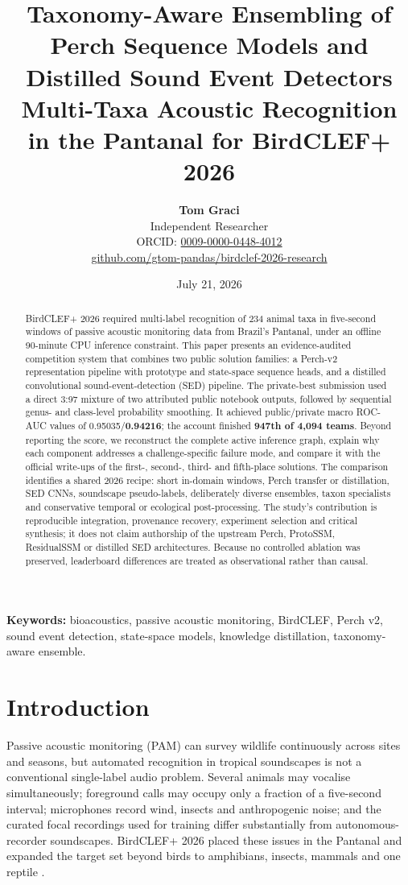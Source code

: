 \documentclass[10pt,a4paper]{article}
\title{\vspace{-1.2cm}\textcolor{deepblue}{\textbf{Taxonomy-Aware Ensembling of Perch Sequence Models and Distilled Sound Event Detectors}}\\[3pt]
\Large Multi-Taxa Acoustic Recognition in the Pantanal for BirdCLEF+ 2026}
\author{\textbf{Tom Graci}\\Independent Researcher\\
ORCID: \href{https://orcid.org/0009-0000-0448-4012}{0009-0000-0448-4012}\\
\href{https://github.com/gtom-pandas/birdclef-2026-research}{github.com/gtom-pandas/birdclef-2026-research}}
\date{July 21, 2026}
\begin{document}
\maketitle

\begin{abstract}
BirdCLEF+ 2026 required multi-label recognition of 234 animal taxa in five-second windows of passive acoustic monitoring data from Brazil's Pantanal, under an offline 90-minute CPU inference constraint. This paper presents an evidence-audited competition system that combines two public solution families: a Perch-v2 representation pipeline with prototype and state-space sequence heads, and a distilled convolutional sound-event-detection (SED) pipeline. The private-best submission used a direct 3:97 mixture of two attributed public notebook outputs, followed by sequential genus- and class-level probability smoothing. It achieved public/private macro ROC-AUC values of 0.95035/\textbf{0.94216}; the account finished \textbf{947th of 4,094 teams}. Beyond reporting the score, we reconstruct the complete active inference graph, explain why each component addresses a challenge-specific failure mode, and compare it with the official write-ups of the first-, second-, third- and fifth-place solutions. The comparison identifies a shared 2026 recipe: short in-domain windows, Perch transfer or distillation, SED CNNs, soundscape pseudo-labels, deliberately diverse ensembles, taxon specialists and conservative temporal or ecological post-processing. The study's contribution is reproducible integration, provenance recovery, experiment selection and critical synthesis; it does not claim authorship of the upstream Perch, ProtoSSM, ResidualSSM or distilled SED architectures. Because no controlled ablation was preserved, leaderboard differences are treated as observational rather than causal.
\end{abstract}

\noindent\textbf{Keywords:} bioacoustics, passive acoustic monitoring, BirdCLEF, Perch v2, sound event detection, state-space models, knowledge distillation, taxonomy-aware ensemble.

\section{Introduction}
Passive acoustic monitoring (PAM) can survey wildlife continuously across sites and seasons, but automated recognition in tropical soundscapes is not a conventional single-label audio problem. Several animals may vocalise simultaneously; foreground calls may occupy only a fraction of a five-second interval; microphones record wind, insects and anthropogenic noise; and the curated focal recordings used for training differ substantially from autonomous-recorder soundscapes. BirdCLEF+ 2026 placed these issues in the Pantanal and expanded the target set beyond birds to amphibians, insects, mammals and one reptile \cite{kahl2026birdclef}.
\end{document}
